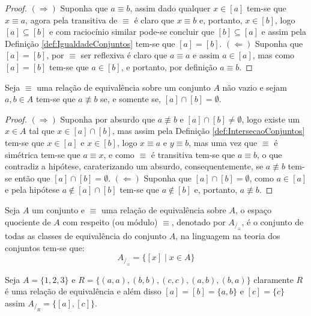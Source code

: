 \begin{proof}
	$(\Rightarrow)$ Suponha que $a \equiv b$, assim dado  qualquer $x \in [a]$ tem-se que $x \equiv a$, agora pela transitiva de $\equiv$ é claro que $x \equiv b$ e, portanto, $x \in [b]$, logo $[a] \subseteq [b]$ e com raciocínio similar pode-se concluir que $[b] \subseteq [a]$ e assim pela Definição \ref{def:IgualdadeConjuntos} tem-se que $[a] = [b]$. $(\Leftarrow)$ Suponha que $[a] = [b]$, por $\equiv$ ser reflexiva é claro que $a \equiv a$ e assim $a \in [a]$, mas como $[a] = [b]$ tem-se que $a \in [b]$, e portanto, por definição $a \equiv b$.
\end{proof}

\begin{theorem}\label{teo:EquivalenciaPropriedade2}
	Seja $\equiv$ uma relação de equivalência sobre um conjunto $A$ não vazio e sejam $a, b \in A$ tem-se que $a \not\equiv b$ se, e somente se, $[a] \cap [b] = \emptyset$.
\end{theorem}

\begin{proof}
	$(\Rightarrow)$ Suponha por absurdo que $a \not\equiv b$ e $[a] \cap [b] \neq \emptyset$, logo existe um $x \in A$ tal que $x \in [a] \cap [b]$, mas assim pela Definição \ref{def:IntersecaoConjuntos} tem-se que $x \in [a]$ e $x \in [b]$, logo $x \equiv a$ e $y \equiv b$, mas uma vez que $\equiv$ é simétrica tem-se que $a \equiv x$, e como $\equiv$ é transitiva tem-se que $a \equiv b$, o que contradiz a hipótese, caraterizando um absurdo, consequentemente, se $a \not\equiv b$ tem-se então que $[a] \cap [b] = \emptyset$. $(\Leftarrow)$ Suponha que $[a] \cap [b] = \emptyset$, como $a \in [a]$ e pela hipótese $a \notin [a] \cap [b]$ tem-se que $a \notin [b]$ e, portanto, $a \not\equiv b$.
\end{proof}

\begin{definition}
	Seja $A$ um conjunto e $\equiv$ uma relação de equivalência sobre $A$, o espaço quociente de $A$ com respeito (ou módulo) $\equiv$, denotado por $A_{/_\equiv}$, é o conjunto de todas as classes de equivalência do conjunto $A$, na linguagem na teoria dos conjuntos tem-se que:
	$$A_{/_\equiv} = \{[x] \mid x \in A\}$$
\end{definition}

\begin{example}
	Seja $A = \{1, 2, 3\}$ e $R = \{(a, a), (b, b), (c, c), (a, b), (b, a)\}$ claramente $R$ é uma relação de equivalência e além disso $[a] = [b] = \{a, b\}$ e $[c] = \{c\}$ assim $A_{/_R} = \{[a], [c]\}$.
\end{example}

